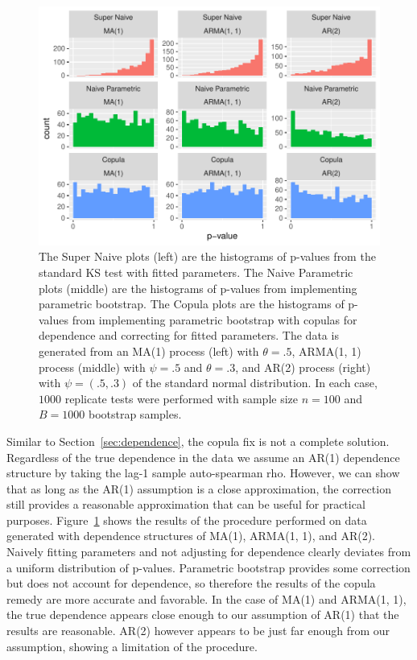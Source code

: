 \documentclass[12pt, letterpaper, titlepage]{article}
\begin{document}
\begin{figure}[tbp]
  \centering
  \includegraphics[width=\textwidth]{hist_ma1_arma_ar2_FD}
  \caption{The Super Naive plots (left) are the histograms of p-values from the 
  standard KS test with fitted parameters. The Naive Parametric plots (middle) 
  are the histograms of p-values from implementing parametric bootstrap. The 
  Copula plots are the histograms of p-values from implementing parametric 
  bootstrap with copulas for dependence and correcting for fitted parameters. 
  The data is generated from an MA(1) process (left) with $\theta = .5$, ARMA(1,
  1) process (middle) with $\psi = .5$ and $\theta = .3$, and AR(2) process 
  (right) with $\psi = (.5, .3)$ of the standard normal distribution. In each 
  case, $1000$ replicate tests were performed with sample size $n = 100$ and 
  $B = 1000$ bootstrap samples.}
  \label{fig:hist_ma1_arma_ar2_FD}
\end{figure}

Similar to Section~\ref{sec:dependence}, the copula fix is not a complete 
solution. Regardless of the true dependence in the data we assume an AR(1) 
dependence structure by taking the lag-1 sample auto-spearman rho. However, we 
can show that as long as the AR(1) assumption is a close approximation, the 
correction still provides a reasonable approximation that can be useful for 
practical purposes. Figure~\ref{fig:hist_ma1_arma_ar2_FD} shows the results of the 
procedure performed on data generated with dependence structures of  MA(1), 
ARMA(1, 1), and AR(2). Naively fitting parameters and not adjusting for 
dependence clearly deviates from a uniform distribution of p-values. Parametric 
bootstrap provides some correction but does not account for dependence, so 
therefore the results of the copula remedy are more accurate and favorable.
In the case of MA(1) and ARMA(1, 1), the true dependence appears close enough 
to our assumption of AR(1) that the results are reasonable. AR(2) however
appears to be just far enough from our assumption, showing a limitation of the 
procedure.
\end{document}
